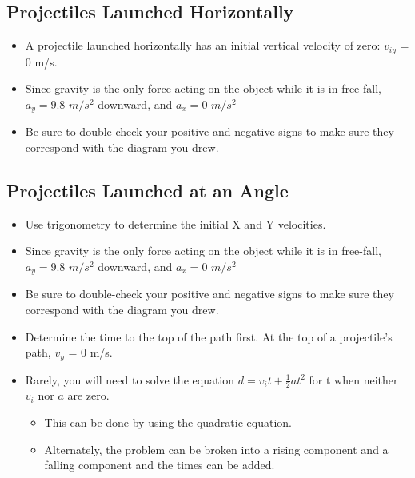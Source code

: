 \documentclass[letterpaper, 12pt]{article}
\begin{document}
 

\subsection*{Projectiles Launched Horizontally}
\begin{itemize}
	\item A projectile launched horizontally has an initial vertical velocity of zero: $v_{iy}$  = 0 m/s.  
	\item Since gravity is the only force acting on the object while it is in free-fall, $a_y = 9.8$ $m/s^2$ downward, and $a_x = 0$ $m/s^2$
	\item Be sure to double-check your positive and negative signs to make sure they correspond with the diagram you drew.
	
\end{itemize}

\subsection*{Projectiles Launched at an Angle}
	\begin{itemize}
	\item Use trigonometry to determine the initial X and Y velocities. 
	\item Since gravity is the only force acting on the object while it is in free-fall, $a_y = 9.8$ $m/s^2$ downward, and $a_x = 0$ $m/s^2$
	\item Be sure to double-check your positive and negative signs to make sure they correspond with the diagram you drew.
	\item Determine the time to the top of the path first.  At the top of a projectile's path, $v_{y}$ = 0 m/s.    
	\item Rarely, you will need to solve the equation $d = v_i t + \frac{1}{2}at^2$ for t when neither $v_i$ nor $a$ are zero. 
	\begin{itemize}
		\item This can be done by using the quadratic equation.
		\item  Alternately, the problem can be broken into a rising component and a falling component and the times can be added. 
	\end{itemize} 
	
	\end{itemize}


 
 
\end{document}
